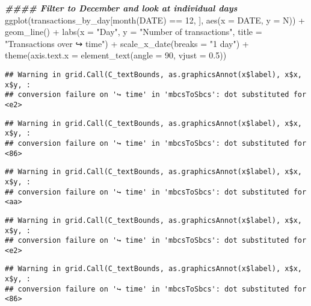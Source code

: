 \documentclass[
]{article}
\newenvironment{Shaded}{\begin{snugshade}}{\end{snugshade}}
\newcommand{\AttributeTok}[1]{\textcolor[rgb]{0.77,0.63,0.00}{#1}}
\newcommand{\DecValTok}[1]{\textcolor[rgb]{0.00,0.00,0.81}{#1}}
\newcommand{\DocumentationTok}[1]{\textcolor[rgb]{0.56,0.35,0.01}{\textbf{\textit{#1}}}}
\newcommand{\FloatTok}[1]{\textcolor[rgb]{0.00,0.00,0.81}{#1}}
\newcommand{\FunctionTok}[1]{\textcolor[rgb]{0.00,0.00,0.00}{#1}}
\newcommand{\NormalTok}[1]{#1}
\newcommand{\SpecialCharTok}[1]{\textcolor[rgb]{0.00,0.00,0.00}{#1}}
\newcommand{\StringTok}[1]{\textcolor[rgb]{0.31,0.60,0.02}{#1}}
\begin{document}
\begin{Shaded}
\begin{Highlighting}[]
\DocumentationTok{\#\#\#\# Filter to December and look at individual days}
\FunctionTok{ggplot}\NormalTok{(transactions\_by\_day[}\FunctionTok{month}\NormalTok{(DATE) }\SpecialCharTok{==} \DecValTok{12}\NormalTok{, ], }\FunctionTok{aes}\NormalTok{(}\AttributeTok{x =}\NormalTok{ DATE, }\AttributeTok{y =}\NormalTok{ N)) }\SpecialCharTok{+}
\FunctionTok{geom\_line}\NormalTok{() }\SpecialCharTok{+}
\FunctionTok{labs}\NormalTok{(}\AttributeTok{x =} \StringTok{"Day"}\NormalTok{, }\AttributeTok{y =} \StringTok{"Number of transactions"}\NormalTok{, }\AttributeTok{title =} \StringTok{"Transactions over}
\StringTok{↪ time"}\NormalTok{) }\SpecialCharTok{+}
\FunctionTok{scale\_x\_date}\NormalTok{(}\AttributeTok{breaks =} \StringTok{"1 day"}\NormalTok{) }\SpecialCharTok{+}
\FunctionTok{theme}\NormalTok{(}\AttributeTok{axis.text.x =} \FunctionTok{element\_text}\NormalTok{(}\AttributeTok{angle =} \DecValTok{90}\NormalTok{, }\AttributeTok{vjust =} \FloatTok{0.5}\NormalTok{))}
\end{Highlighting}
\end{Shaded}

\begin{verbatim}
## Warning in grid.Call(C_textBounds, as.graphicsAnnot(x$label), x$x, x$y, :
## conversion failure on '↪ time' in 'mbcsToSbcs': dot substituted for <e2>
\end{verbatim}

\begin{verbatim}
## Warning in grid.Call(C_textBounds, as.graphicsAnnot(x$label), x$x, x$y, :
## conversion failure on '↪ time' in 'mbcsToSbcs': dot substituted for <86>
\end{verbatim}

\begin{verbatim}
## Warning in grid.Call(C_textBounds, as.graphicsAnnot(x$label), x$x, x$y, :
## conversion failure on '↪ time' in 'mbcsToSbcs': dot substituted for <aa>
\end{verbatim}

\begin{verbatim}
## Warning in grid.Call(C_textBounds, as.graphicsAnnot(x$label), x$x, x$y, :
## conversion failure on '↪ time' in 'mbcsToSbcs': dot substituted for <e2>
\end{verbatim}

\begin{verbatim}
## Warning in grid.Call(C_textBounds, as.graphicsAnnot(x$label), x$x, x$y, :
## conversion failure on '↪ time' in 'mbcsToSbcs': dot substituted for <86>
\end{verbatim}
\end{document}
